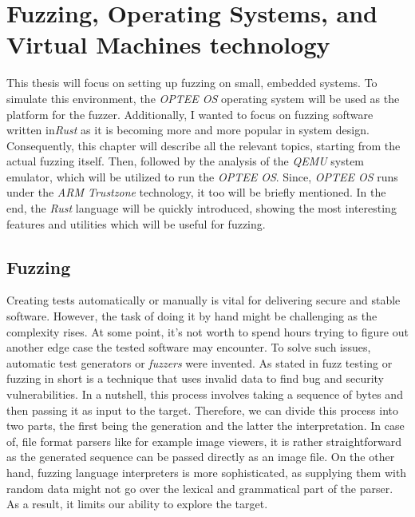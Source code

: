 \cleardoublepage

\section{Fuzzing, Operating Systems, and Virtual Machines technology}

This thesis will focus on setting up fuzzing on small, embedded systems. To simulate this environment, the \textit{OPTEE OS} operating system will be used as the platform for the fuzzer. Additionally, I wanted to focus on fuzzing software written in\textit{Rust} as it is becoming more and more popular in system design. Consequently, this chapter will describe all the relevant topics, starting from the actual fuzzing itself. Then, followed by the analysis of the \textit{QEMU} system emulator, which will be utilized to run the \textit{OPTEE OS}. Since, \textit{OPTEE OS} runs under the \textit{ARM Trustzone} technology, it too will be briefly mentioned. In the end, the \textit{Rust} language will be quickly introduced, showing the most interesting features and utilities which will be useful for fuzzing.

\subsection{Fuzzing} \label{chap:theory}

Creating tests automatically or manually is vital for delivering secure and stable software. However, the task of doing it by hand might be challenging as the complexity rises. At some point, it's not worth to spend hours trying to figure out another edge case the tested software may encounter. To solve such issues, automatic test generators or \textit{fuzzers} were invented. As stated in \cite{fuzzing_state_of_art} fuzz testing or fuzzing in short is a technique that uses invalid data to find bug and security vulnerabilities. In a nutshell, this process involves taking a sequence of bytes and then passing it as input to the target. Therefore, we can divide this process into two parts, the first being the generation and the latter the interpretation. In case of, file format parsers like for example image viewers, it is rather straightforward as the generated sequence can be passed directly as an image file. On the other hand, fuzzing language interpreters is more sophisticated, as supplying them with random data might not go over the lexical and grammatical part of the parser. As a result, it limits our ability to explore the target.


